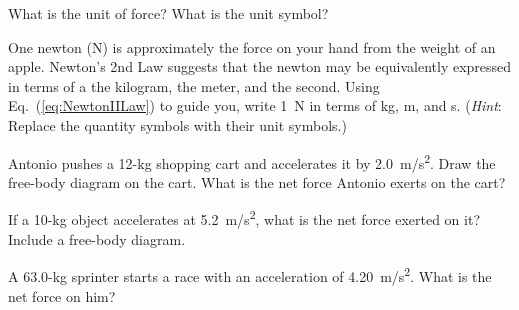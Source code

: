 \documentclass{article}
\begin{document}
\begin{center}
\end{center}


\begin{exercise} \label{01Hh51}
What is the unit of force? What is the unit symbol?
\end{exercise}

\begin{exercise} \label{YQwD8z}
One newton (N) is approximately the force on your hand from the weight of an apple. Newton's 2nd Law suggests that the newton may be equivalently expressed in terms of a the kilogram, the meter, and the second.  Using Eq.~(\ref{eq:NewtonIILaw}) to guide you, write \SI{1}{N} in terms of kg, m, and s. (\textit{Hint}: Replace the quantity symbols with their unit symbols.)
\end{exercise}

\begin{exercise} \label{aBCVA3}
Antonio pushes a 12-kg shopping cart and accelerates it by \SI{2.0}{m/s^2}. Draw the free-body diagram on the cart. What is the net force Antonio exerts on the cart?
\end{exercise}

\begin{exercise} \label{Sm9Zw6}
    If a 10-kg object accelerates at \SI{5.2}{m/s^2}, what is the net force exerted on it? Include a free-body diagram.  
\end{exercise}

\begin{exercise} \label{RbjKEg}
    A 63.0-kg sprinter starts a race with an acceleration of \SI{4.20}{m/s^2}. What is the net force on him?
\end{exercise}
\end{document}
